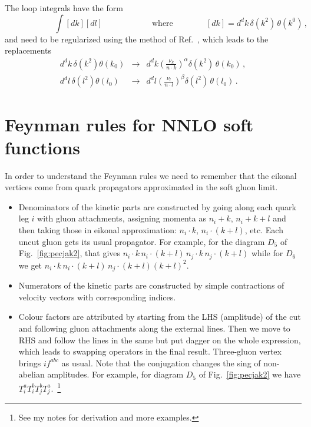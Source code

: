 \documentclass[a4paper,11pt]{report}
\numberwithin{equation}{section}
\begin{document}
The loop integrals have the form
%
\begin{equation}
  \qquad \qquad \qquad
  \int [dk] [dl]
  \qquad \qquad \qquad \text{where} \qquad  \qquad
  [dk] = d^d k\, \delta(k^2)\, \theta(k^0)\,,
\end{equation}
%
and need to be regularized using the method of Ref.~\cite{Becher:2011dz},
which leads to the replacements
%
\begin{subequations}
   \begin{eqnarray}
     d^d k\, \delta(k^2) \theta(k_0) 
     & \to &
     d^d k \left(\frac{\nu_k}{n \cdot k} \right)^{\alpha}\!
     \delta(k^2)\, \theta(k_0)\,, 
     \\[0.5em]
     d^d l\, \delta(l^2) \theta(l_0) 
     & \to &
     d^d l \left(\frac{\nu_l}{n \cdot l} \right)^{\beta}\!
     \delta(l^2)\, \theta(l_0)\,.
   \end{eqnarray}
   \label{eq:analytic-reg}
\end{subequations}

\section{Feynman rules for NNLO soft functions}
\label{sec:FRsoft}

In order to understand the Feynman rules we need to remember that the eikonal
vertices come from quark propagators approximated in the soft gluon limit.
%
\begin{itemize}
  \item
  Denominators of the kinetic parts are constructed by going along each quark
  leg $i$ with gluon attachments, assigning momenta as $n_i+k$, $n_i+k+l$ and
  then taking those in eikonal approximation: $n_i \cdot k$, $n_i \cdot (k+l)$,
  etc. 
  Each uncut gluon gets its usual propagator.
  For example, for the diagram $D_5$ of Fig.~\ref{fig:pecjak2}, that gives $n_i
  \cdot k\, n_i \cdot (k+l)\, n_j \cdot k\, n_j \cdot (k+l)$ while for $D_6$ we
  get $n_i \cdot k\, n_i \cdot (k+l)\, n_j \cdot (k+l) (k+l)^2$.
  \item
  Numerators of the kinetic parts are constructed by simple contractions of
  velocity vectors with corresponding indices.
  \item
  Colour factors are attributed by starting from the LHS (amplitude) of the cut
  and following gluon attachments along the external lines. 
  Then we move to RHS and follow the lines in the same but put dagger on the
  whole expression, which leads to swapping operators in the final result.
  Three-gluon vertex brings $i f^{abc}$ as usual. Note that the conjugation
  changes the sing of non-abelian amplitudes.
  For example, for diagram $D_5$ of Fig.~\ref{fig:pecjak2} we have 
  $T_i^a T_i^b T_j^b T_j^a$.~\footnote{See my notes for derivation and more
  examples.}
\end{itemize}
\end{document}
